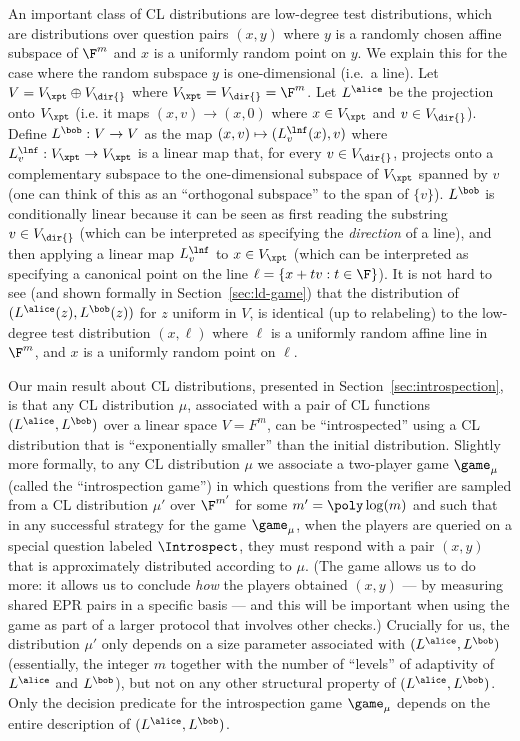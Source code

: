 An important class of CL distributions are low-degree test distributions, which are distributions over question pairs $(x,y)$ where $y$ is a randomly chosen affine subspace of $\F^m$ and $x$ is a uniformly random point on $y$. We explain this for the case where the random subspace $y$ is one-dimensional (i.e.\ a line). Let $V = V_\xpt \oplus V_{\dir{}}$ where $V_\xpt = V_{\dir{}} = \F^m$. Let $L^\alice$ be the projection onto $V_\xpt$ (i.e. it maps $(x,v) \to (x,0)$ where $x \in V_\xpt$ and $v \in V_{\dir{}}$). Define $L^\bob: V \to V$ as the map $(x,v) \mapsto (L^\lnf_v(x),v)$ where $L^\lnf_v: V_\xpt \to V_\xpt$ is a linear map that, for every $v \in V_{\dir{}}$, projects onto a complementary subspace to the one-dimensional subspace of $V_\xpt$ spanned by $v$ (one can think of this as an ``orthogonal subspace'' to the span of $\{ v \}$). $L^\bob$ is conditionally linear because it can be seen as first reading the substring $v \in V_{\dir{}}$ (which can be interpreted as specifying the \emph{direction} of a line), and then applying a linear map $L^\lnf_v$ to $x \in V_\xpt$ (which can be interpreted as specifying a canonical point on the line $\ell = \{ x + tv : t \in \F \}$). It is not hard to see (and shown formally in Section~\ref{sec:ld-game}) that the distribution of $(L^\alice(z),L^\bob(z))$ for $z$ uniform in $V$, is identical (up to relabeling) to the low-degree test distribution $(x,\ell)$ where $\ell$ is a uniformly random affine line in $\F^m$, and $x$ is a uniformly random point on $\ell$.





Our main result about CL distributions, presented in Section~\ref{sec:introspection}, is that any CL distribution $\mu$, associated with a pair of CL functions $(L^\alice,L^\bob)$ over a linear space $V=F^m$, can be ``introspected'' using a CL distribution that is ``exponentially smaller'' than the initial distribution. Slightly more formally, to any CL distribution $\mu$ we associate a two-player game $\game_\mu$ (called the ``introspection game'') in which questions from the verifier are sampled from a CL distribution $\mu'$ over $\F^{m'}$ for some $m' = \poly\log(m)$ and such that in any successful strategy for the game $\game_\mu$, when the players are queried on a special question labeled $\Introspect$, they must respond with a pair $(x,y)$ that is approximately distributed according to $\mu$.
(The game allows us to do more: it allows us to conclude \emph{how} the players obtained $(x,y)$ --- by measuring shared EPR pairs in a specific basis --- and this will be important when using the game as part of a larger protocol that involves other checks.) 
Crucially for us, the distribution $\mu'$ only depends on a size parameter associated with $(L^\alice,L^\bob)$ (essentially, the integer $m$ together with the number of ``levels'' of adaptivity of $L^\alice$ and $L^\bob$), but not on any other structural property of $(L^\alice,L^\bob)$. Only the decision predicate for the introspection game $\game_\mu$ depends on the entire description of $(L^\alice,L^\bob)$.

